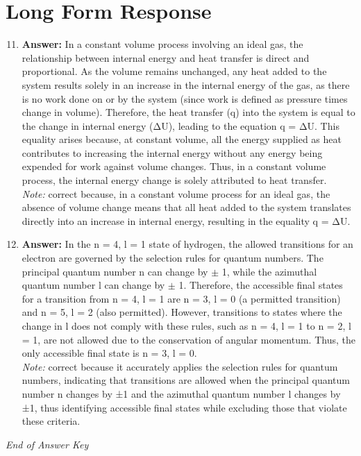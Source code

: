 \documentclass[12pt]{article}
\begin{document}
\section*{Long Form Response}
\begin{enumerate}[label=\arabic*.]
\setcounter{enumi}{10}
\item \textbf{Answer:} In a constant volume process involving an ideal gas, the relationship between internal energy and heat transfer is direct and proportional. As the volume remains unchanged, any heat added to the system results solely in an increase in the internal energy of the gas, as there is no work done on or by the system (since work is defined as pressure times change in volume). Therefore, the heat transfer (q) into the system is equal to the change in internal energy (ΔU), leading to the equation q = ΔU. This equality arises because, at constant volume, all the energy supplied as heat contributes to increasing the internal energy without any energy being expended for work against volume changes. Thus, in a constant volume process, the internal energy change is solely attributed to heat transfer.
\\ \textit{Note:} correct because, in a constant volume process for an ideal gas, the absence of volume change means that all heat added to the system translates directly into an increase in internal energy, resulting in the equality q = ΔU.
\item \textbf{Answer:} In the n = 4, l = 1 state of hydrogen, the allowed transitions for an electron are governed by the selection rules for quantum numbers. The principal quantum number n can change by \ensuremath{\pm} 1, while the azimuthal quantum number l can change by \ensuremath{\pm} 1. Therefore, the accessible final states for a transition from n = 4, l = 1 are n = 3, l = 0 (a permitted transition) and n = 5, l = 2 (also permitted). However, transitions to states where the change in l does not comply with these rules, such as n = 4, l = 1 to n = 2, l = 1, are not allowed due to the conservation of angular momentum. Thus, the only accessible final state is n = 3, l = 0.
\\ \textit{Note:} correct because it accurately applies the selection rules for quantum numbers, indicating that transitions are allowed when the principal quantum number n changes by ±1 and the azimuthal quantum number l changes by ±1, thus identifying accessible final states while excluding those that violate these criteria.
\end{enumerate}

\vfill
\noindent\textit{End of Answer Key}
\end{document}
